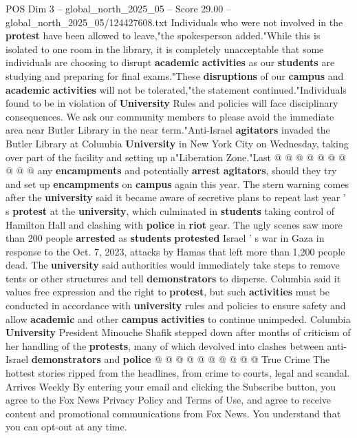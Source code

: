 \begin{textsample}{POS Dim 3 – global\_north\_2025\_05 – Score 29.00 – global\_north\_2025\_05/124427608.txt}
Individuals who were not involved in the \textbf{protest} have been allowed to leave,"the spokesperson added."While this is isolated to one room in the library, it is completely unacceptable that some individuals are choosing to disrupt \textbf{academic} \textbf{activities} as our \textbf{students} are studying and preparing for final exams."These \textbf{disruptions} of our \textbf{campus} and \textbf{academic} \textbf{activities} will not be tolerated,"the statement continued."Individuals found to be in violation of \textbf{University} Rules and policies will face disciplinary consequences.
We ask our community members to please avoid the immediate area near Butler Library in the near term."Anti-Israel \textbf{agitators} invaded the Butler Library at Columbia \textbf{University} in New York City on Wednesday, taking over part of the facility and setting up a"Liberation Zone."Last @ @ @ @ @ @ @ @ @ @ any \textbf{encampments} and potentially \textbf{arrest} \textbf{agitators}, should they try and set up \textbf{encampments} on \textbf{campus} again this year.
The stern warning comes after the \textbf{university} said it became aware of secretive plans to repeat last year ' s \textbf{protest} at the \textbf{university}, which culminated in \textbf{students} taking control of Hamilton Hall and clashing with \textbf{police} in \textbf{riot} gear.
The ugly scenes saw more than 200 people \textbf{arrested} as \textbf{students} \textbf{protested} Israel ' s war in Gaza in response to the Oct. 7, 2023, attacks by Hamas that left more than 1,200 people dead.
The \textbf{university} said authorities would immediately take steps to remove tents or other structures and tell \textbf{demonstrators} to disperse.
Columbia said it values free expression and the right to \textbf{protest}, but such \textbf{activities} must be conducted in accordance with \textbf{university} rules and policies to ensure safety and allow \textbf{academic} and other \textbf{campus} \textbf{activities} to continue unimpeded.
Columbia \textbf{University} President Minouche Shafik stepped down after months of criticism of her handling of the \textbf{protests}, many of which devolved into clashes between anti-Israel \textbf{demonstrators} and \textbf{police} @ @ @ @ @ @ @ @ @ @ True Crime The hottest stories ripped from the headlines, from crime to courts, legal and scandal.
Arrives Weekly By entering your email and clicking the Subscribe button, you agree to the Fox News Privacy Policy and Terms of Use, and agree to receive content and promotional communications from Fox News.
You understand that you can opt-out at any time.

\end{textsample}
